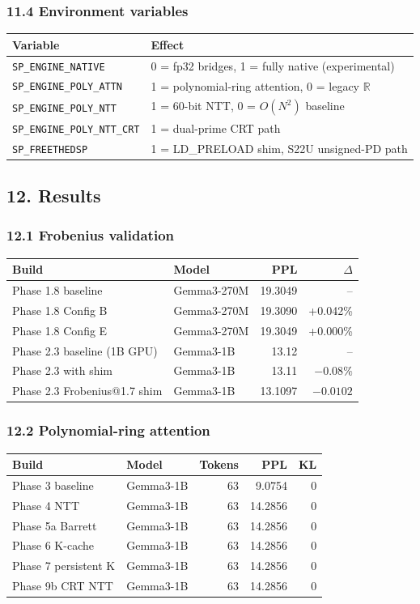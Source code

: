 \documentclass[
  11pt,
]{article}
\begin{document}
\hypertarget{environment-variables}{%
\subsubsection{11.4 Environment variables}\label{environment-variables}}

\begin{longtable}[]{@{}ll@{}}
\toprule
Variable & Effect\tabularnewline
\midrule
\endhead
\texttt{SP\_ENGINE\_NATIVE} & 0 = fp32 bridges, 1 = fully native
(experimental)\tabularnewline
\texttt{SP\_ENGINE\_POLY\_ATTN} & 1 = polynomial-ring attention, 0 =
legacy \(\mathbb{R}\)\tabularnewline
\texttt{SP\_ENGINE\_POLY\_NTT} & 1 = 60-bit NTT, 0 = \(O(N^2)\)
baseline\tabularnewline
\texttt{SP\_ENGINE\_POLY\_NTT\_CRT} & 1 = dual-prime CRT
path\tabularnewline
\texttt{SP\_FREETHEDSP} & 1 = LD\_PRELOAD shim, S22U unsigned-PD
path\tabularnewline
\bottomrule
\end{longtable}

\hypertarget{results}{%
\subsection{12. Results}\label{results}}

\hypertarget{frobenius-validation}{%
\subsubsection{12.1 Frobenius validation}\label{frobenius-validation}}

\begin{longtable}[]{@{}llrr@{}}
\toprule
Build & Model & PPL & \(\Delta\)\tabularnewline
\midrule
\endhead
Phase 1.8 baseline & Gemma3-270M & 19.3049 & --\tabularnewline
Phase 1.8 Config B & Gemma3-270M & 19.3090 & +0.042\%\tabularnewline
Phase 1.8 Config E & Gemma3-270M & 19.3049 & +0.000\%\tabularnewline
Phase 2.3 baseline (1B GPU) & Gemma3-1B & 13.12 & --\tabularnewline
Phase 2.3 with shim & Gemma3-1B & 13.11 & \(-0.08\%\)\tabularnewline
Phase 2.3 Frobenius@1.7 shim & Gemma3-1B & 13.1097 &
\(-0.0102\)\tabularnewline
\bottomrule
\end{longtable}

\hypertarget{polynomial-ring-attention-1}{%
\subsubsection{12.2 Polynomial-ring
attention}\label{polynomial-ring-attention-1}}

\begin{longtable}[]{@{}llrrr@{}}
\toprule
Build & Model & Tokens & PPL & KL\tabularnewline
\midrule
\endhead
Phase 3 baseline & Gemma3-1B & 63 & 9.0754 & 0\tabularnewline
Phase 4 NTT & Gemma3-1B & 63 & 14.2856 & 0\tabularnewline
Phase 5a Barrett & Gemma3-1B & 63 & 14.2856 & 0\tabularnewline
Phase 6 K-cache & Gemma3-1B & 63 & 14.2856 & 0\tabularnewline
Phase 7 persistent K & Gemma3-1B & 63 & 14.2856 & 0\tabularnewline
Phase 9b CRT NTT & Gemma3-1B & 63 & 14.2856 & 0\tabularnewline
\bottomrule
\end{longtable}
\end{document}
